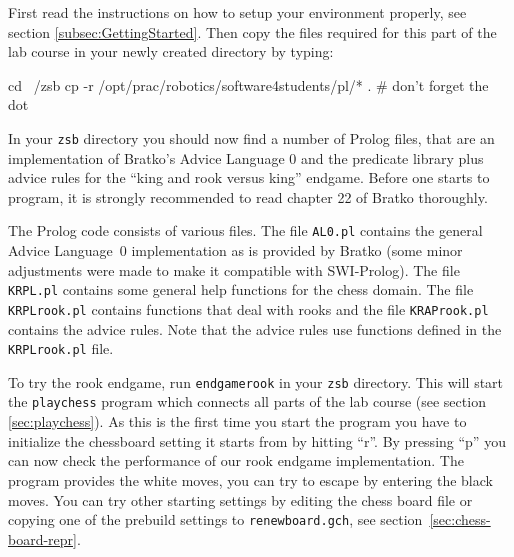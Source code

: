 \documentclass[10pt]{scrartcl}
\begin{document}
First read the instructions on how to setup your environment properly,
see section \ref{subsec:GettingStarted}. Then copy the files required for this
part of the lab course in your newly created directory by typing:

\begin{verbatimtab}
cd ~/zsb
cp -r /opt/prac/robotics/software4students/pl/* . # don't forget the dot
\end{verbatimtab}

In your {\tt zsb} directory you should now find a number of Prolog files,
that are an implementation of Bratko's Advice Language 0 and the
predicate library plus advice rules for the ``king and rook versus
king'' endgame.  Before one starts to program, it is strongly
recommended to read chapter 22 of Bratko thoroughly.

The Prolog code consists of various files. The file {\tt AL0.pl} contains
the general Advice Language~0 implementation as is provided by Bratko
(some minor adjustments were made to make it compatible with SWI-Prolog).
The file {\tt KRPL.pl} contains some general help functions for the chess
domain. %
The file {\tt KRPLrook.pl} contains functions that deal with rooks
and the file {\tt KRAProok.pl} contains the advice rules. Note that
the advice rules use functions defined in the {\tt KRPLrook.pl}
file.

To try the rook endgame, run {\tt endgamerook} in your {\tt zsb} directory.
This will start the {\tt playchess} program which connects all parts of the lab course
(see section \ref{sec:playchess}).
As this is the first time you start the program you have to
initialize the chessboard setting it starts from by hitting ``r''.
By pressing ``p'' you can now check the performance of our rook endgame
implementation.
The program provides the white moves, you can try to escape by entering the black moves.
You can try other starting settings
by editing the chess board file or copying one of the prebuild settings
to \verb|renewboard.gch|, see section~\ref{sec:chess-board-repr}.
\end{document}
